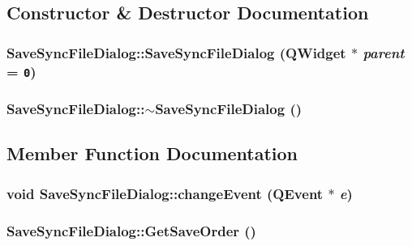 \subsection{Constructor \& Destructor Documentation}
\hypertarget{class_save_sync_file_dialog_4f2afe785fab484ced94a0b9e1518690}{
\subsubsection[{SaveSyncFileDialog}]{\setlength{\rightskip}{0pt plus 5cm}SaveSyncFileDialog::SaveSyncFileDialog (QWidget $\ast$ {\em parent} = {\tt 0})}}
\label{class_save_sync_file_dialog_4f2afe785fab484ced94a0b9e1518690}


\hypertarget{class_save_sync_file_dialog_3e0469e66efab7874faa2ca9b84803e4}{
\subsubsection[{$\sim$SaveSyncFileDialog}]{\setlength{\rightskip}{0pt plus 5cm}SaveSyncFileDialog::$\sim$SaveSyncFileDialog ()}}
\label{class_save_sync_file_dialog_3e0469e66efab7874faa2ca9b84803e4}




\subsection{Member Function Documentation}
\hypertarget{class_save_sync_file_dialog_7e101b5c3d58be37c8c23a3a193d4bf7}{
\subsubsection[{changeEvent}]{\setlength{\rightskip}{0pt plus 5cm}void SaveSyncFileDialog::changeEvent (QEvent $\ast$ {\em e})}}
\label{class_save_sync_file_dialog_7e101b5c3d58be37c8c23a3a193d4bf7}


\hypertarget{class_save_sync_file_dialog_a5eee73fcd8018437417415ab21fec54}{
\subsubsection[{GetSaveOrder}]{ SaveSyncFileDialog::GetSaveOrder ()}}
\label{class_save_sync_file_dialog_a5eee73fcd8018437417415ab21fec54}


